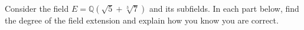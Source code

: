 \documentclass[11pt]{exam}
\def\Q{\mathbb Q}
\begin{document}
\begin{questions}


\newpage

\question[12] Consider the field $E = \Q(\sqrt{5}+\sqrt[3]{7})$ and its subfields.  In each part below, find the degree of the field extension and explain how you know you are correct.


\end{questions}
\end{document}
